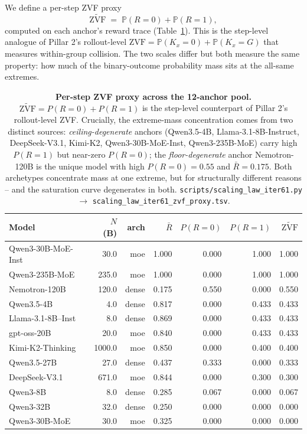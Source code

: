 \documentclass{article}
\providecommand{\tableref}[1]{Table~\ref{#1}}
\begin{document}
We define a per-step ZVF proxy
\begin{equation}
  \widetilde{\mathrm{ZVF}} \;=\; \mathbb{P}(R = 0) + \mathbb{P}(R = 1),
  \label{eq:zvf-proxy}
\end{equation}
computed on each anchor's reward trace (\tableref{tab:scaling-iter61-zvf}).
This is the step-level analogue of Pillar 2's rollout-level
\(\mathrm{ZVF} = \mathbb{P}(K_x = 0) + \mathbb{P}(K_x = G)\)
that measures within-group collision.  The two scales differ but
both measure the same property: how much of the binary-outcome
probability mass sits at the all-same extremes.

\begin{table}[t]
  \centering
  \small
  \begin{tabular}{lrrrrrr}
    \toprule
    Model & \(N\) (B) & arch & \(\bar R\) & \(P(R=0)\) & \(P(R=1)\) & \(\widetilde{\mathrm{ZVF}}\) \\
    \midrule
    Qwen3-30B-MoE-Inst & 30.0 & moe & 1.000 & 0.000 & 1.000 & 1.000 \\
    Qwen3-235B-MoE & 235.0 & moe & 1.000 & 0.000 & 1.000 & 1.000 \\
    Nemotron-120B & 120.0 & dense & 0.175 & 0.550 & 0.000 & 0.550 \\
    Qwen3.5-4B & 4.0 & dense & 0.817 & 0.000 & 0.433 & 0.433 \\
    Llama-3.1-8B--Inst & 8.0 & dense & 0.869 & 0.000 & 0.433 & 0.433 \\
    gpt-oss-20B & 20.0 & moe & 0.840 & 0.000 & 0.433 & 0.433 \\
    Kimi-K2-Thinking & 1000.0 & moe & 0.850 & 0.000 & 0.400 & 0.400 \\
    Qwen3.5-27B & 27.0 & dense & 0.437 & 0.333 & 0.000 & 0.333 \\
    DeepSeek-V3.1 & 671.0 & moe & 0.844 & 0.000 & 0.300 & 0.300 \\
    Qwen3-8B & 8.0 & dense & 0.285 & 0.067 & 0.000 & 0.067 \\
    Qwen3-32B & 32.0 & dense & 0.250 & 0.000 & 0.000 & 0.000 \\
    Qwen3-30B-MoE & 30.0 & moe & 0.325 & 0.000 & 0.000 & 0.000 \\
    \bottomrule
  \end{tabular}
  \caption{\textbf{Per-step ZVF proxy across the 12-anchor pool.}
    \(\widetilde{\mathrm{ZVF}} = P(R=0) + P(R=1)\) is the
    step-level counterpart of Pillar 2's rollout-level ZVF.
    Crucially, the extreme-mass concentration comes from two
    distinct sources: \emph{ceiling-degenerate} anchors
    (Qwen3.5-4B, Llama-3.1-8B-Instruct, DeepSeek-V3.1, Kimi-K2,
    Qwen3-30B-MoE-Inst, Qwen3-235B-MoE) carry high \(P(R=1)\) but
    near-zero \(P(R=0)\); the
    \emph{floor-degenerate} anchor Nemotron-120B is the unique
    model with high \(P(R=0)=0.55\) and \(\bar R = 0.175\).
    Both archetypes concentrate mass at one extreme, but for
    structurally different reasons -- and the saturation curve
    degenerates in both.  \texttt{scripts/scaling\_law\_iter61.py}
    \(\to\) \texttt{scaling\_law\_iter61\_zvf\_proxy.tsv}.}
  \label{tab:scaling-iter61-zvf}
\end{table}
\end{document}
